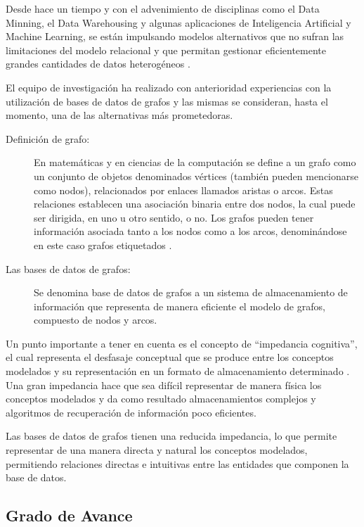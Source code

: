 \documentclass[
	11pt,oneside,a4paper,
	fleqn,
	article
]{memoir}
\begin{document}
Desde hace un tiempo y con el advenimiento de disciplinas como el Data Minning, el Data Warehousing y algunas aplicaciones de Inteligencia Artificial y Machine Learning, se están impulsando modelos alternativos que no sufran las limitaciones del modelo relacional y que permitan gestionar eficientemente grandes cantidades de datos heterogéneos \cite{vicknair2010comparison}. 

El equipo de investigación ha realizado con anterioridad experiencias con la utilización de bases de datos de grafos y las mismas se consideran, hasta el momento, una de las alternativas más prometedoras.

\begin{description}
	\item[Definición de grafo:]{
		En matemáticas y en ciencias de la computación se define a un grafo como un	conjunto de objetos denominados vértices (también pueden mencionarse como nodos), relacionados por enlaces llamados aristas o arcos. Estas relaciones establecen una asociación binaria entre dos nodos, la cual puede ser dirigida, en uno u otro sentido, o no. Los grafos pueden tener información asociada tanto a los nodos como a los arcos, denominándose en este caso grafos etiquetados \cite{van2008handbook}. }

	\item[Las bases de datos de grafos:]{
		Se denomina base de datos de grafos a un sistema de almacenamiento de información que representa de manera eficiente el modelo de grafos, compuesto de nodos y arcos.}
\end{description}

Un punto importante a tener en cuenta es el concepto de ``impedancia cognitiva'', el cual representa el desfasaje conceptual que se produce entre los conceptos modelados y su representación en un formato de almacenamiento determinado \cite{robinson2015graph}. Una gran impedancia hace que sea difícil representar de manera física los conceptos modelados y da como resultado almacenamientos complejos y algoritmos de recuperación de información poco eficientes.

Las bases de datos de grafos tienen una reducida impedancia, lo que permite representar de una manera directa y natural los conceptos modelados, permitiendo relaciones directas e intuitivas entre las entidades que componen la base de datos.

\subsection{Grado de Avance}
\end{document}
